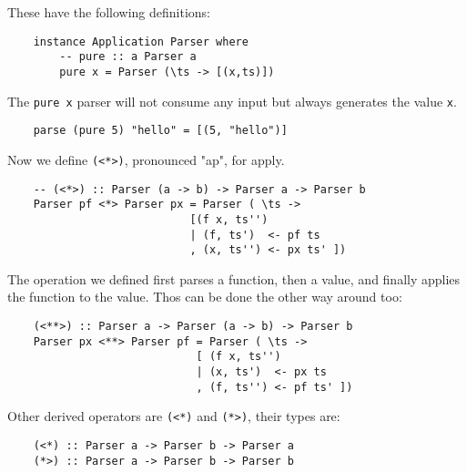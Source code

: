 \documentclass[a4paper,12pt]{article}
\theoremstyle{remark}
\begin{document}
These have the following definitions:

\begin{lstlisting}
    instance Application Parser where
        -- pure :: a Parser a
        pure x = Parser (\ts -> [(x,ts)])  \end{lstlisting}

The \lstinline{pure x} parser will not consume any input but always generates the value \lstinline{x}.

\begin{lstlisting}
    parse (pure 5) "hello" = [(5, "hello")]  \end{lstlisting}

Now we define \lstinline{(<*>)}, pronounced "ap", for apply.

\begin{lstlisting}
    -- (<*>) :: Parser (a -> b) -> Parser a -> Parser b
    Parser pf <*> Parser px = Parser ( \ts ->
                            [(f x, ts'')
                            | (f, ts')  <- pf ts
                            , (x, ts'') <- px ts' ])  \end{lstlisting}

\begin{figure}[H]
  \centering
\end{figure}

The operation we defined first parses a function, then a value, and finally applies
the function to the value. Thos can be done the other way around too:

\begin{lstlisting}
    (<**>) :: Parser a -> Parser (a -> b) -> Parser b
    Parser px <**> Parser pf = Parser ( \ts ->
                             [ (f x, ts'')
                             | (x, ts')  <- px ts
                             , (f, ts'') <- pf ts' ])  \end{lstlisting}

\begin{figure}[H]
  \centering
\end{figure}

Other derived operators are \lstinline{(<*)} and \lstinline{(*>)}, their types are:

\begin{lstlisting}
    (<*) :: Parser a -> Parser b -> Parser a
    (*>) :: Parser a -> Parser b -> Parser b  \end{lstlisting}
\end{document}
